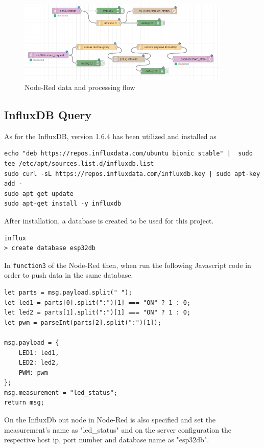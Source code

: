 \documentclass[a4paper,12pt]{article}
\begin{document}
		\begin{figure}[H]
			\centering
			\includegraphics[width=0.9\textwidth]{node1.png}
			\caption{Node-Red data and processing flow}
			\label{fig1:}
		\end{figure}		



\subsection{InfluxDB Query}

As for the InfluxDB, version 1.6.4 has been utilized and installed
as 
{\scriptsize
\begin{verbatim} 
echo "deb https://repos.influxdata.com/ubuntu bionic stable" |  sudo tee /etc/apt/sources.list.d/influxdb.list
sudo curl -sL https://repos.influxdata.com/influxdb.key | sudo apt-key add -
sudo apt get update
sudo apt-get install -y influxdb
\end{verbatim}
}
After installation, a database is created to be used for this project.

{\scriptsize
\begin{verbatim}
influx
> create database esp32db
\end{verbatim}
}

In \texttt{function3} of the Node-Red then, when run the following 
Javascript code in order to push data in the same database.

{\scriptsize
\begin{verbatim}
let parts = msg.payload.split(" ");
let led1 = parts[0].split(":")[1] === "ON" ? 1 : 0;
let led2 = parts[1].split(":")[1] === "ON" ? 1 : 0;
let pwm = parseInt(parts[2].split(":")[1]);

msg.payload = {
    LED1: led1,
    LED2: led2,
    PWM: pwm
};
msg.measurement = "led_status";
return msg;
\end{verbatim}
}

On the InfluxDb out node in Node-Red is also specified and set
the measurement's name as "led\_status" and 
on the server configuration the
respective host ip, port number and database name as "esp32db".
\end{document}
